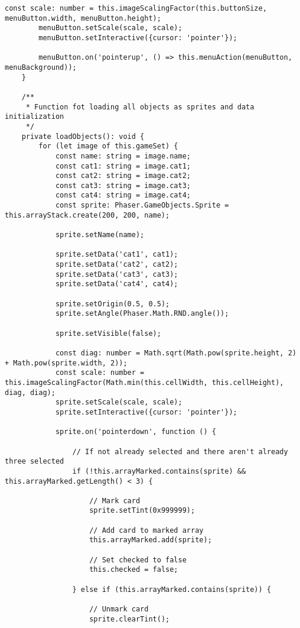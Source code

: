 \begin{lstlisting}[style=TypeScript, caption={gameScene.ts}]
        const scale: number = this.imageScalingFactor(this.buttonSize, menuButton.width, menuButton.height);
        menuButton.setScale(scale, scale);
        menuButton.setInteractive({cursor: 'pointer'});

        menuButton.on('pointerup', () => this.menuAction(menuButton, menuBackground));
    }

    /**
     * Function fot loading all objects as sprites and data initialization
     */
    private loadObjects(): void {
        for (let image of this.gameSet) {
            const name: string = image.name;
            const cat1: string = image.cat1;
            const cat2: string = image.cat2;
            const cat3: string = image.cat3;
            const cat4: string = image.cat4;
            const sprite: Phaser.GameObjects.Sprite = this.arrayStack.create(200, 200, name);

            sprite.setName(name);

            sprite.setData('cat1', cat1);
            sprite.setData('cat2', cat2);
            sprite.setData('cat3', cat3);
            sprite.setData('cat4', cat4);

            sprite.setOrigin(0.5, 0.5);
            sprite.setAngle(Phaser.Math.RND.angle());

            sprite.setVisible(false);

            const diag: number = Math.sqrt(Math.pow(sprite.height, 2) + Math.pow(sprite.width, 2));
            const scale: number = this.imageScalingFactor(Math.min(this.cellWidth, this.cellHeight), diag, diag);
            sprite.setScale(scale, scale);
            sprite.setInteractive({cursor: 'pointer'});

            sprite.on('pointerdown', function () {

                // If not already selected and there aren't already three selected
                if (!this.arrayMarked.contains(sprite) && this.arrayMarked.getLength() < 3) {

                    // Mark card
                    sprite.setTint(0x999999);

                    // Add card to marked array
                    this.arrayMarked.add(sprite);

                    // Set checked to false
                    this.checked = false;

                } else if (this.arrayMarked.contains(sprite)) {

                    // Unmark card
                    sprite.clearTint();


\end{lstlisting}
